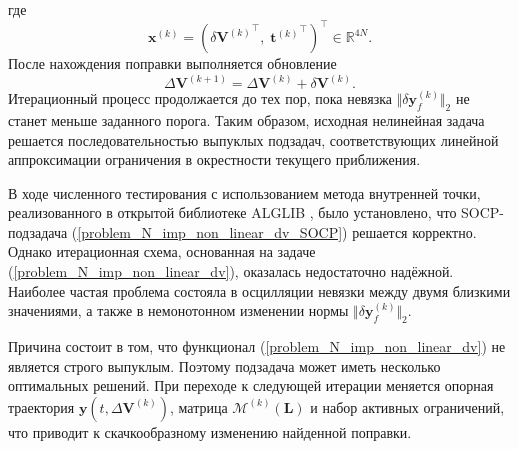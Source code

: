 где
\begin{equation}
    \mathbf{x}^{(k)} = \left( \delta {\mathbf{V}^{(k)}}^\top, \; {\mathbf{t}^{(k)}}^\top \right)^\top \in \mathbb{R}^{4N}.
\end{equation}
После нахождения поправки выполняется обновление 
\begin{equation*}
    \Delta \mathbf{V}^{(k+1)} = \Delta \mathbf{V}^{(k)} + \delta \mathbf{V}^{(k)}.
\end{equation*}
Итерационный процесс продолжается до тех пор, пока невязка $\Vert \delta \mathbf{y}_f^{(k)} \Vert_2$ не станет меньше заданного порога. Таким образом, исходная нелинейная задача решается последовательностью выпуклых подзадач, соответствующих линейной аппроксимации ограничения в окрестности текущего приближения.

В ходе численного тестирования с использованием метода внутренней точки, реализованного в открытой библиотеке ALGLIB \cite{bochkanov_alglib}, было установлено, что SOCP-подзадача (\ref{problem_N_imp_non_linear_dv_SOCP}) решается корректно. Однако итерационная схема, основанная на задаче (\ref{problem_N_imp_non_linear_dv}), оказалась недостаточно надёжной. Наиболее частая проблема состояла в осцилляции невязки между двумя близкими значениями, а также в немонотонном изменении нормы $\Vert \delta \mathbf{y}_f^{(k)} \Vert_2$.

Причина состоит в том, что функционал (\ref{problem_N_imp_non_linear_dv}) не является строго выпуклым. Поэтому подзадача может иметь несколько оптимальных решений. При переходе к следующей итерации меняется опорная траектория $\mathbf{y}(t, \Delta \mathbf{V}^{(k)})$, матрица $\mathcal{M}^{(k)} (\mathbf{L})$ и набор активных ограничений, что приводит к скачкообразному изменению найденной поправки.

